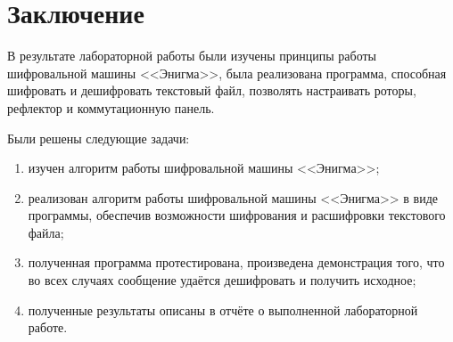 \chapter*{Заключение}

В результате лабораторной работы были изучены принципы работы шифровальной машины <<Энигма>>, была реализована программа, способная шифровать и дешифровать текстовый файл, позволять настраивать роторы, рефлектор и коммутационную панель. 

Были решены следующие задачи:

\begin{enumerate}[label=\arabic*)]
	\item изучен алгоритм работы шифровальной машины <<Энигма>>;
    \item реализован алгоритм работы шифровальной машины <<Энигма>> в виде программы, обеспечив возможности шифрования и расшифровки текстового файла;
	\item полученная программа протестирована, произведена демонстрация того, что во всех случаях сообщение удаётся дешифровать и получить исходное;
	\item полученные результаты описаны в отчёте о выполненной лабораторной работе.
\end{enumerate}